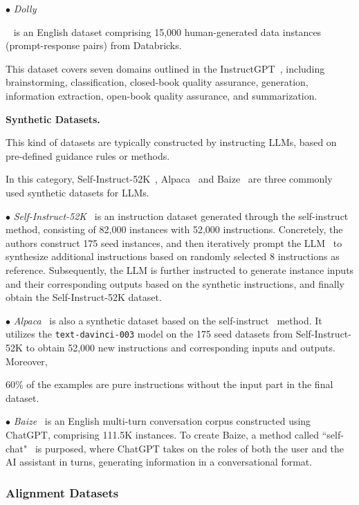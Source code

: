 $\bullet$ \emph{Dolly}{~\cite{Conover-2023-arxiv-Dolly} is an English dataset comprising 15,000 human-generated data instances (prompt-response pairs) from Databricks.  

This dataset covers seven domains outlined in the InstructGPT~\cite{Ouyang-arxiv-2022-Training}, including brainstorming, classification, closed-book quality assurance, generation, information extraction, open-book quality assurance, and summarization. }

\textbf{Synthetic Datasets.} {This kind of datasets are typically constructed  by instructing  LLMs, based on pre-defined guidance rules or methods.

In this category, Self-Instruct-52K~\cite{Wang-arXiv-2022-Self}, Alpaca~\cite{Taori-github-2023-Stanford} and Baize~\cite{xu-arxiv-2023-baize} are three commonly used synthetic datasets for LLMs.}

$\bullet$ \emph{Self-Instruct-52K}~\cite{Wang-arXiv-2022-Self} is an instruction dataset generated through the self-instruct~\cite{Wang-arXiv-2022-Self} method, consisting of 82,000 instances with 52,000 instructions. Concretely, the authors construct 175 seed instances, and then iteratively prompt the LLM~\cite{Brown-NeurIPS-2020-Language} to synthesize additional instructions based on randomly selected 8 instructions as reference. Subsequently, the LLM is further instructed  to generate instance inputs and their corresponding outputs based on the synthetic instructions, and finally obtain the Self-Instruct-52K dataset. 

$\bullet$ \emph{Alpaca}~\cite{Taori-github-2023-Stanford} is also a synthetic dataset based on the self-instruct~\cite{Wang-arXiv-2022-Self} method. It utilizes the \texttt{text-davinci-003} model on the 175 seed datasets from Self-Instruct-52K to obtain 52,000 new  instructions and corresponding inputs and outputs. Moreover,  

60\% of the examples are pure instructions without the input part in the final dataset.

$\bullet$ \emph{Baize}~\cite{xu-arxiv-2023-baize} is an English multi-turn conversation corpus constructed using ChatGPT, comprising 111.5K instances. To create Baize, a method called ``self-chat"~\cite{xu-arxiv-2023-baize} is purposed, where ChatGPT takes on the roles of both the user and the AI assistant in turns, generating information in a conversational format. 

\subsubsection{Alignment Datasets}
\label{sec:commonly_used_aligntuning}

